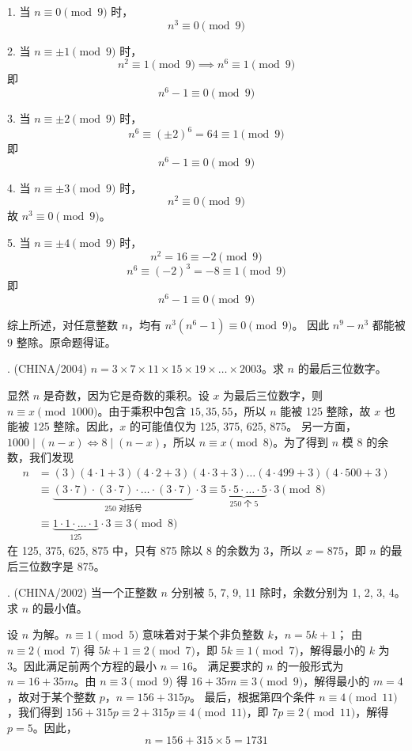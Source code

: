 \begin{questions}
\begin{solution}
1. 当 $n \equiv 0 \pmod 9$ 时，
\[
n^3 \equiv 0 \pmod 9
\]

2. 当 $n \equiv \pm 1 \pmod 9$ 时，
\[
n^2 \equiv 1 \pmod 9 \implies n^6 \equiv 1 \pmod 9
\]
即
\[
n^6 - 1 \equiv 0 \pmod 9
\]

3. 当 $n \equiv \pm 2 \pmod 9$ 时，
\[
n^6 \equiv (\pm 2)^6 = 64 \equiv 1 \pmod 9
\]
即
\[
n^6 - 1 \equiv 0 \pmod 9
\]

4. 当 $n \equiv \pm 3 \pmod 9$ 时，
\[
n^2 \equiv 0 \pmod 9
\]
故 $n^3 \equiv 0 \pmod 9$。

5. 当 $n \equiv \pm 4 \pmod 9$ 时，
\[
n^2 = 16 \equiv -2 \pmod 9
\]
\[
n^6 \equiv (-2)^3 = -8 \equiv 1 \pmod 9
\]
即
\[
n^6 - 1 \equiv 0 \pmod 9
\]

综上所述，对任意整数 $n$，均有 $n^3(n^6-1) \equiv 0 \pmod 9$。
因此 $n^9 - n^3$ 都能被 $9$ 整除。原命题得证。
\end{solution}

. (CHINA/2004) $n = 3 \times 7 \times 11 \times 15 \times 19 \times \dots \times 2003$。求 $n$ 的最后三位数字。
\begin{solution}
显然 $n$ 是奇数，因为它是奇数的乘积。设 $x$ 为最后三位数字，则 $n \equiv x \pmod{1000}$。由于乘积中包含 $15, 35, 55$，所以 $n$ 能被 125 整除，故 $x$ 也能被 125 整除。因此，$x$ 的可能值仅为 125, 375, 625, 875。
另一方面，$1000 \mid (n - x) \iff 8 \mid (n - x)$，所以 $n \equiv x \pmod 8$。为了得到 $n$ 模 8 的余数，我们发现
\begin{align*}
n &= (3)(4 \cdot 1 + 3)(4 \cdot 2 + 3)(4 \cdot 3 + 3) \dots (4 \cdot 499 + 3)(4 \cdot 500 + 3) \\
&\equiv \underbrace{(3 \cdot 7) \cdot (3 \cdot 7) \cdot \dots \cdot (3 \cdot 7)}_{250 \text{ 对括号}} \cdot 3 \equiv \underbrace{5 \cdot 5 \cdot \dots \cdot 5}_{250 \text{ 个 } 5} \cdot 3 \pmod 8 \\
&\equiv \underbrace{1 \cdot 1 \cdot \dots \cdot 1}_{125} \cdot 3 \equiv 3 \pmod 8
\end{align*}
在 125, 375, 625, 875 中，只有 875 除以 8 的余数为 3，所以 $x = 875$，即 $n$ 的最后三位数字是 875。
\end{solution}

. (CHINA/2002) 当一个正整数 $n$ 分别被 5, 7, 9, 11 除时，余数分别为 1, 2, 3, 4。求 $n$ 的最小值。
\begin{solution}
设 $n$ 为解。$n \equiv 1 \pmod 5$ 意味着对于某个非负整数 $k$，$n = 5k + 1$；
由 $n \equiv 2 \pmod 7$ 得 $5k + 1 \equiv 2 \pmod 7$，即 $5k \equiv 1 \pmod 7$，解得最小的 $k$ 为 3。因此满足前两个方程的最小 $n = 16$。
满足要求的 $n$ 的一般形式为 $n = 16 + 35m$。由 $n \equiv 3 \pmod 9$ 得 $16 + 35m \equiv 3 \pmod 9$，解得最小的 $m = 4$，故对于某个整数 $p$，$n = 156 + 315p$。
最后，根据第四个条件 $n \equiv 4 \pmod{11}$，我们得到 $156 + 315p \equiv 2 + 315p \equiv 4 \pmod{11}$，即 $7p \equiv 2 \pmod{11}$，解得 $p = 5$。因此，
\[
n = 156 + 315 \times 5 = 1731
\]
\end{solution}


\end{questions}
